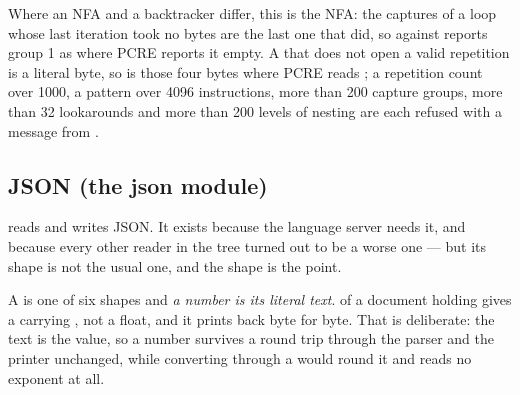 Where an NFA and a backtracker differ, this is the NFA: the captures of a loop
whose last iteration took no bytes are the last one that did, so 
against  reports group 1 as  where PCRE reports it empty. A
\ic{\{} that does not open a valid repetition is a literal byte, so
 is those four bytes where PCRE reads ; a repetition
count over 1000, a pattern over 4096 instructions, more than 200 capture groups,
more than 32 lookarounds and more than 200 levels of \ic{(} nesting are each
refused with a message from .



\subsection{JSON (the json module)}
\label{sec:builtin-json}

 reads and writes JSON. It exists because the language server
needs it, and because every other reader in the tree turned out to be a worse
one --- but its shape is not the usual one, and the shape is the point.

A  is one of six shapes and \emph{a number is its literal text}.
 of a document holding  gives a  carrying
, not a float, and it prints back byte for byte. That is deliberate:
the text is the value, so a number survives a round trip through the parser and
the printer unchanged, while converting through a  would round it and
 reads no exponent at all.

